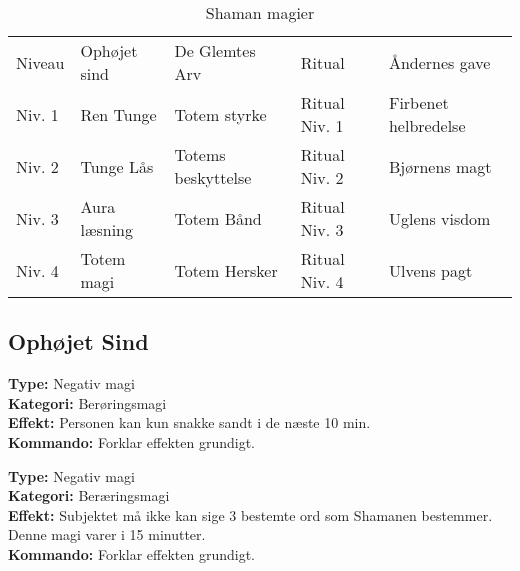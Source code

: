 \begin{table}[H]
    \centering
    \begin{tabular}{|p{}|p{}|p{}|p{}|p{}|}
    \hline
    \rowcolor{cerulean!80}
    \multicolumn{5}{c}{Shaman magi}\\
    \hline
    \rowcolor{cerulean!40}
         Niveau & Ophøjet sind & De Glemtes Arv & Ritual & Åndernes gave \\\hline
         
        Niv. 1 & Ren Tunge & Totem styrke & Ritual Niv. 1 & Firbenet helbredelse\\\hline

        Niv. 2 & Tunge Lås & Totems beskyttelse & Ritual Niv. 2 & Bjørnens magt\\\hline
    
         Niv. 3 & Aura læsning & Totem Bånd & Ritual Niv. 3 & Uglens visdom\\\hline
         
         Niv. 4 & Totem magi & Totem Hersker & Ritual Niv. 4 & Ulvens pagt\\\hline
         \end{tabular}
         \caption{Shaman magier}
\end{table}

\subsection*{Ophøjet Sind}
\begin{meditation*}
\textbf{Type:} Negativ magi\\
\textbf{Kategori:} Berøringsmagi\\
\textbf{Effekt:} Personen kan kun snakke sandt i de næste 10 min.\\
\textbf{Kommando:} Forklar effekten grundigt.
\end{meditation*}

\begin{meditation*}
\textbf{Type:} Negativ magi\\
\textbf{Kategori:} Beræringsmagi\\
\textbf{Effekt:} Subjektet må ikke kan sige 3 bestemte ord som Shamanen bestemmer. Denne magi varer i 15 minutter.\\
\textbf{Kommando:} Forklar effekten grundigt.
\end{meditation*}

